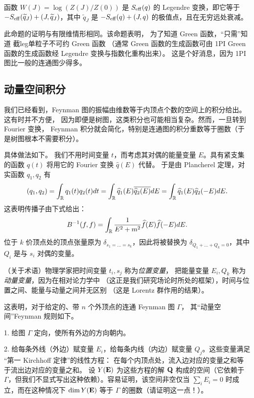\begin{proposition} 函数 $W(J)=\log(Z(J)/Z(0))$
是 $S_{\rm eff}(q)$ 的 Legendre 变换，即它等于
$-S_{\rm eff}(\widetilde q_J)+(J,\widetilde q_J)$，其中 $\widetilde q_J$ 是
$-S_{\rm eff}(q)+(J,q)$ 的极值点，且在无穷远处衰减。
\end{proposition}

此命题的证明与有限维情形相同。该命题表明，
为了知道 Green 函数，“只需”知道
截leg单粒子不可约 Green 函数
（通常 Green 函数的生成函数可由 1PI Green 函数的生成函数经
Legendre 变换与指数化重构出来）。
这是个好消息，因为 1PI 图比一般的连通图少得多。

\subsection{动量空间积分}

我们已经看到，Feynman 图的振幅由维数等于内顶点个数的空间上的积分给出。这有时并不方便，
因为即便是树图，这类积分也可能相当复杂。然而，一旦转到 Fourier 变换，
Feynman 积分就会简化，特别是连通图的积分重数等于圈数（于是树图根本不需要积分）。

具体做法如下。
我们不用时间变量 $t$，而考虑其对偶的能量变量 $E$。具有紧支集的函数
$q(t)$ 将用它的 Fourier 变换 $\widehat q(E)$ 代替。
于是由 Plancherel 定理，对实函数
$q_1,q_2$ 有
$$
(q_1,q_2)=\int_{\Bbb R}q_1(t)q_2(t)dt=\int_{\Bbb R} \widehat q_1(E)\overline{\widehat q_2(E)}dE=
\int_{\Bbb R} \widehat q_1(E)\widehat q_2(-E)dE.
$$
这表明传播子由下式给出：
$$
B^{-1}(f,f)=\int_{\Bbb R} \frac{1}{E^2+m^2}\widehat f(E)\widehat f(-E)dE.
$$
位于 $k$ 价顶点处的顶点张量原为 $\delta_{s_1=...=s_k}$，因此将被替换为 $\delta_{Q_1+...+Q_k=0}$，其中 $Q_i$ 是与 $s_i$ 对偶的变量。

\begin{remark} （关于术语）物理学家把时间变量 $t_i,s_j$ 称为\emph{位置变量}，
把能量变量 $E_i,Q_k$ 称为\emph{动量变量}，因为在相对论力学中
（这正是我们研究场论时所处的框架），时间与位置之间、能量与动量之间并无区别
（这是 Lorentz 群作用的结果）。
\end{remark}

这表明，对于给定的、带 $n$ 个外顶点的连通 Feynman 图 $\Gamma$，
其“动量空间”Feynman 规则如下。

1. 给图 $\Gamma$ 定向，使所有外边的方向朝内。

2. 给每条外线（外边）赋变量 $E_i$，给每条内线（内边）赋变量 $Q_j$。这些变量满足
“第一 Kirchhoff 定律”的线性方程：
在每个内顶点处，流入边对应的变量之和等于流出边对应的变量之和。
设 $Y(\bold E)$ 为这些方程的解 $\bold Q$ 构成的空间（它依赖于 $\Gamma$，但我们不显式写出这种依赖）。容易证明，该空间非空仅当 $\sum_i E_i=0$ 时成立，而在这种情况下 $\dim Y(\bold E)$ 等于 $\Gamma$ 的圈数（请证明这一点！）。

